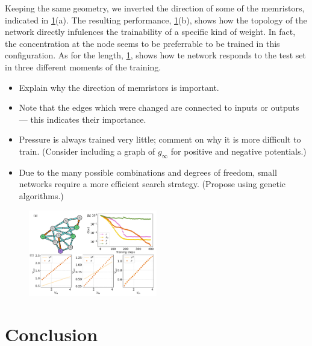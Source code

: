 \documentclass[reprint,superscriptaddress,prb,showkeys]{revtex4-2}
\begin{document}
Keeping the same geometry, we inverted the direction of some of the memristors, indicated in \cref{fig:lin_regr2}(a). The resulting performance, \cref{fig:lin_regr2}(b), shows how the topology of the network directly infulences the trainability of a specific kind of weight. In fact, the concentration at the node seems to be preferrable to be trained in this configuration. As for the length, \cref{fig:lin_regr2}, shows how te network responds to the test set in three different moments of the training.

\begin{itemize}
    \item Explain why the direction of memristors is important.
    \item Note that the edges which were changed are connected to inputs or outputs — this indicates their importance.
    \item Pressure is always trained very little; comment on why it is more difficult to train. (Consider including a graph of $g_{\infty}$ for positive and negative potentials.)
    \item Due to the many possible combinations and degrees of freedom, small networks require a more efficient search strategy. (Propose using genetic algorithms.)
\end{itemize}

\begin{figure}[h]
    \centering
    \includegraphics[width=0.5\textwidth]{plots/regression/G00010002.pdf}
    \caption{}\label{fig:lin_regr2}
\end{figure} 

\cleardoublepage
\section{Conclusion}

\appendix




\clearpage
 

\end{document}
